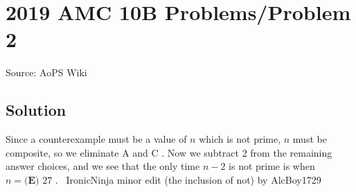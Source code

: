 \documentclass[12pt]{article}
\begin{document}
\section*{{2019 AMC 10B Problems/Problem 2}}
Source: AoPS Wiki

\subsection*{Solution}
Since a counterexample must be a value of $n$ which is not prime, $n$ must be composite, so we eliminate $\text{A}$ and $\text{C}$ . Now we subtract $2$ from the remaining answer choices, and we see that the only time $n-2$ is not prime is when $n = \boxed{\textbf{(E) }27}$ . ~IronicNinja minor edit (the inclusion of not) by AlcBoy1729
\end{document}
